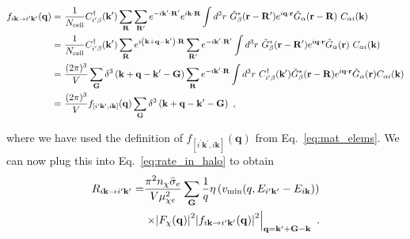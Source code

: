\documentclass[
    prd, twocolumn, superscriptaddress, nofootinbib, amsmath, amssymb,
    aps, floatfix,preprintnumbers
]{revtex4-2}
\begin{document}
        \begin{widetext}
            \begin{equation}
                \begin{split}
                    f_{i\mathbf{k}\rightarrow i^\prime\mathbf{k}^\prime} (\mathbf{q}) =&\ \frac{1}{N_\mathrm{cell}}C_{i^\prime \beta}^\dagger(\mathbf{k^\prime}) \sum_{\mathbf{R}} \sum_{\mathbf{R^\prime}}e^{-i\mathbf{k^\prime\cdot R^\prime}} e^{i\mathbf{k\cdot R}}\int d^3r\ \Tilde{G}_\beta^*(\mathbf{r - R^\prime})e^{i\mathbf{q\cdot r}}\Tilde{G}_\alpha(\mathbf{r - R})\ C_{\alpha i}(\mathbf{k})\\
                    =&\ \frac{1}{N_\mathrm{cell}}C_{i^\prime \beta}^\dagger(\mathbf{k^\prime}) \sum_{\mathbf{R}}e^{i\mathbf{\left(k+q-k^\prime\right)\cdot R}} \sum_{\mathbf{R^\prime}}e^{-i\mathbf{k^\prime\cdot R^\prime}}\int d^3 r\ \Tilde{G}_\beta^* (\mathbf{r - R^\prime})e^{i\mathbf{q\cdot r}}\Tilde{G}_\alpha (\mathbf{r})\ C_{\alpha i}(\mathbf{k})\\
                    =&\ \frac{(2\pi)^3}{V}\sum_{\mathbf{G}}\delta^3\left(\mathbf{k + q - k^\prime - G}\right)\sum_\mathbf{R}e^{-i\mathbf{k^\prime\cdot R}}\int d^3r\ C^\dagger_{i^\prime\beta}(\mathbf{k}^\prime) \Tilde{G}_\beta^*(\mathbf{r - R}) e^{i\mathbf{q\cdot r}} \Tilde{G}_\alpha(\mathbf{r})C_{\alpha i}(\mathbf{k})\\
                    =&\ \frac{(2\pi)^3}{V} f_{\left[i^\prime\mathbf{k}^\prime,i\mathbf{k}\right]}(\mathbf{q}) \sum_{\mathbf{G}} \delta^3\left(\mathbf{k + q - k^\prime - G}\right)\ ,
                \end{split}
            \end{equation}
        \end{widetext}
        where we have used the definition of $f_{\left[i^\prime\mathbf{k}^\prime,i\mathbf{k}\right]}(\mathbf{q})$ from Eq.~\eqref{eq:mat_elems}. We can now plug this into Eq.~\eqref{eq:rate_in_halo} to obtain
        \begin{equation}
            \begin{split}
                R_{i\mathbf{k}\rightarrow i^\prime \mathbf{k^\prime}} = &\frac{\pi^2 n_\chi \Bar{\sigma}_e}{V\mu_{\chi e}^2}\sum_\mathbf{G}\frac{1}{q}\eta\left(v_\mathrm{min}(q, E_{i^\prime\mathbf{k^\prime}} - E_{i\mathbf{k}})\right)\\
                &\left.\times\abs{F_\chi(\mathbf{q})}^2\abs{f_{i\mathbf{k}\rightarrow i^\prime\mathbf{k}^\prime} (\mathbf{q})}^2\right|_{\mathbf{q = k^\prime + G - k}}\ .
            \end{split}
        \end{equation}
        
\end{document}
